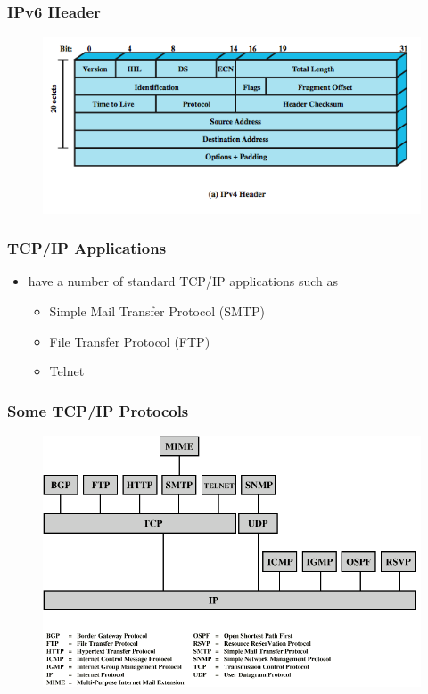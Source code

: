 \documentclass[pdflatex,compress]{beamer}
\begin{document}
\begin{frame}
	\frametitle{IPv6 Header}
	\begin{figure}
		\centering
		\includegraphics[width=\linewidth]{img/img06}
	\end{figure}
\end{frame}

\begin{frame}
	\frametitle{TCP/IP Applications}
	\begin{itemize}
		\item have a number of standard TCP/IP applications such as
		\begin{itemize}
			\item Simple Mail Transfer Protocol (SMTP)
			\item File Transfer Protocol (FTP)
			\item Telnet
		\end{itemize}
	\end{itemize}
\end{frame}

\begin{frame}
	\frametitle{Some TCP/IP Protocols}
	\begin{figure}
		\centering
		\includegraphics[width=\linewidth]{img/img07}
	\end{figure}
\end{frame}
\end{document}
